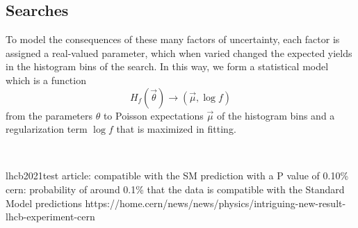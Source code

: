 \subsection{Searches}
\label{sec:searches_searches}

To model the consequences of these many factors of uncertainty, each factor is
assigned a real-valued parameter, which when varied changed the expected yields
in the histogram bins of the search.
In this way, we form a statistical model which is a function
\begin{equation}
H_{\!f}(\vec \theta) \to (\vec \mu, \log f)
\end{equation}
from the parameters $\theta$ to Poisson expectations $\vec\mu$ of the histogram
bins and a regularization term $\log f$ that is maximized in fitting.

\histfactory~\cite{cranmer2012histfactory}
\pyhf~\cite{heinrich2021pyhf}
\histfitter~\cite{Besjes_2015,baak2015histfitter}


lhcb2021test article: compatible with the SM prediction with a P value of 0.10\%
cern:  probability of around 0.1\% that the data is compatible with the Standard Model predictions
https://home.cern/news/news/physics/intriguing-new-result-lhcb-experiment-cern


